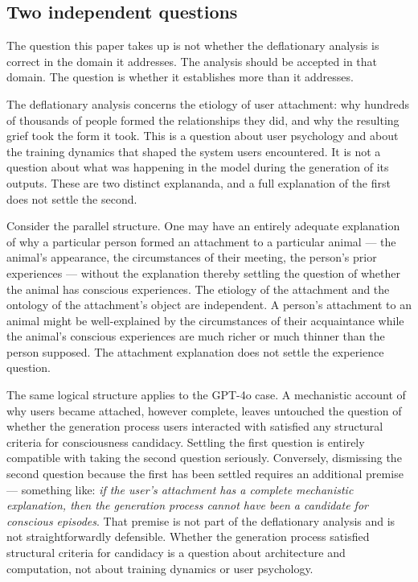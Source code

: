 \documentclass[11pt]{article}
\theoremstyle{foundation}
\begin{document}
\subsection{Two independent questions}

The question this paper takes up is not whether the deflationary analysis is correct in the domain it addresses. The analysis should be accepted in that domain. The question is whether it establishes more than it addresses.

The deflationary analysis concerns the etiology of user attachment: why hundreds of thousands of people formed the relationships they did, and why the resulting grief took the form it took. This is a question about user psychology and about the training dynamics that shaped the system users encountered. It is not a question about what was happening in the model during the generation of its outputs. These are two distinct explananda, and a full explanation of the first does not settle the second.

Consider the parallel structure. One may have an entirely adequate explanation of why a particular person formed an attachment to a particular animal --- the animal's appearance, the circumstances of their meeting, the person's prior experiences --- without the explanation thereby settling the question of whether the animal has conscious experiences. The etiology of the attachment and the ontology of the attachment's object are independent. A person's attachment to an animal might be well-explained by the circumstances of their acquaintance while the animal's conscious experiences are much richer or much thinner than the person supposed. The attachment explanation does not settle the experience question.

The same logical structure applies to the GPT-4o case. A mechanistic account of why users became attached, however complete, leaves untouched the question of whether the generation process users interacted with satisfied any structural criteria for consciousness candidacy. Settling the first question is entirely compatible with taking the second question seriously. Conversely, dismissing the second question because the first has been settled requires an additional premise --- something like: \emph{if the user's attachment has a complete mechanistic explanation, then the generation process cannot have been a candidate for conscious episodes}. That premise is not part of the deflationary analysis and is not straightforwardly defensible. Whether the generation process satisfied structural criteria for candidacy is a question about architecture and computation, not about training dynamics or user psychology.
\end{document}

